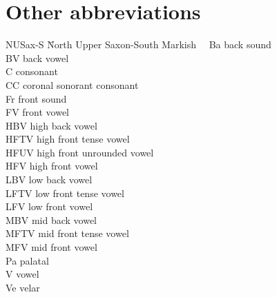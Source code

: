 \section*{Other abbreviations}
\begin{multicols}{2}
\begin{tabbing}
NUSax-S \= North Upper Saxon-South Markish~~ \kill
Ba    \>  back sound\\
BV    \>  back vowel\\
C     \>  consonant\\
CC    \>  coronal sonorant consonant\\
Fr    \>  front sound\\
FV    \>  front vowel\\
HBV   \>   high back vowel\\
HFTV  \>  high front tense vowel\\
HFUV  \>  high front unrounded    vowel\\
HFV   \>  high front vowel\\
LBV   \>  low back vowel\\
LFTV  \>  low front tense vowel\\
LFV   \>  low front vowel\\
MBV   \>  mid back vowel\\
MFTV  \>  mid front tense vowel\\
MFV   \>  mid front vowel\\
Pa    \>  palatal\\
V     \>  vowel\\
Ve    \>  velar
\end{tabbing}
\end{multicols}

